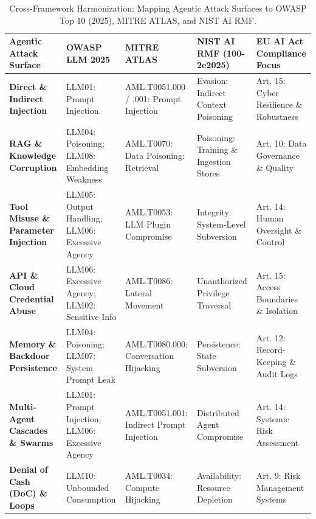 \begin{table}[t]
\centering
\caption{Cross-Framework Harmonization: Mapping Agentic Attack Surfaces to OWASP Top 10 (2025), MITRE ATLAS, and NIST AI RMF.}
\label{tab:standards_mapping}
\footnotesize
\begin{tabularx}{\columnwidth}{p{2.2cm} X X X X}
\toprule
\textbf{Agentic Attack Surface} & \textbf{OWASP LLM 2025~\cite{owasp2025top10}} & \textbf{MITRE ATLAS~\cite{mitre2026atlas}} & \textbf{NIST AI RMF (100-2e2025)~\cite{vassilev2025adversarial}} & \textbf{EU AI Act Compliance Focus} \\
\midrule
\textbf{Direct \& Indirect Injection} & LLM01: Prompt Injection & AML.T0051.000 / .001: Prompt Injection & Evasion: Indirect Context Poisoning & Art. 15: Cyber Resilience \& Robustness \\
\addlinespace
\textbf{RAG \& Knowledge Corruption} & LLM04: Poisoning; LLM08: Embedding Weakness & AML.T0070: Data Poisoning: Retrieval & Poisoning: Training \& Ingestion Stores & Art. 10: Data Governance \& Quality \\
\addlinespace
\textbf{Tool Misuse \& Parameter Injection} & LLM05: Output Handling; LLM06: Excessive Agency & AML.T0053: LLM Plugin Compromise & Integrity: System-Level Subversion & Art. 14: Human Oversight \& Control \\
\addlinespace
\textbf{API \& Cloud Credential Abuse} & LLM06: Excessive Agency; LLM02: Sensitive Info & AML.T0086: Lateral Movement & Unauthorized Privilege Traversal & Art. 15: Access Boundaries \& Isolation \\
\addlinespace
\textbf{Memory \& Backdoor Persistence} & LLM04: Poisoning; LLM07: System Prompt Leak & AML.T0080.000: Conversation Hijacking & Persistence: State Subversion & Art. 12: Record-Keeping \& Audit Logs \\
\addlinespace
\textbf{Multi-Agent Cascades \& Swarms} & LLM01: Prompt Injection; LLM06: Excessive Agency & AML.T0051.001: Indirect Prompt Injection & Distributed Agent Compromise & Art. 14: Systemic Risk Assessment \\
\addlinespace
\textbf{Denial of Cash (DoC) \& Loops} & LLM10: Unbounded Consumption & AML.T0034: Compute Hijacking & Availability: Resource Depletion & Art. 9: Risk Management Systems \\
\bottomrule
\end{tabularx}
\end{table}

